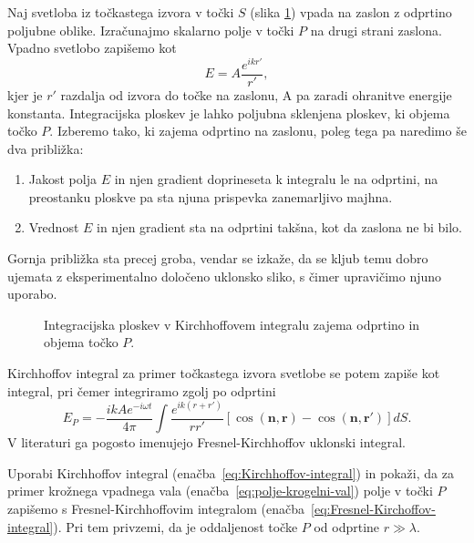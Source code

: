 Naj svetloba iz točkastega izvora v točki $S$ (slika \ref{fig:UklonFK}) vpada na zaslon
z odprtino poljubne oblike. Izračunajmo skalarno polje v točki $P$ na drugi 
strani zaslona. Vpadno svetlobo zapišemo kot
\begin{equation}
\label{eq:polje-krogelni-val}
E = A \frac{e^{ikr'}}{r'},
\end{equation}
kjer je $r'$ razdalja od izvora do točke na zaslonu, A pa zaradi ohranitve energije konstanta.
Integracijska ploskev je lahko poljubna sklenjena ploskev, ki objema točko $P$. Izberemo tako, ki
zajema odprtino na zaslonu, poleg tega pa naredimo še dva približka:\\
\begin{enumerate}
\item Jakost polja $E$ in njen gradient doprineseta k integralu le na odprtini, na preostanku ploskve
pa sta njuna prispevka zanemarljivo majhna.\\
\item Vrednost $E$ in njen gradient sta na odprtini takšna, kot da zaslona ne bi bilo.\\
\end{enumerate}
Gornja približka sta precej groba, vendar se izkaže, da se kljub temu
dobro ujemata z eksperimentalno določeno uklonsko sliko, s čimer 
upravičimo njuno uporabo.

\begin{figure}[]
\centering {} 
  
\caption{Integracijska ploskev v Kirchhoffovem integralu zajema odprtino in objema točko $P$.}
\label{fig:UklonFK}
\end{figure}

Kirchhoffov integral za primer točkastega izvora svetlobe se potem zapiše kot integral, pri čemer
integriramo zgolj po odprtini
\begin{equation}
E_P = -\frac{ik A e^{-i\omega t}}{4\pi}\int\frac{e^{ik(r+r')}}{rr'}\left[\cos(\mathbf{n},
\mathbf{r})-\cos(\mathbf{n},\mathbf{r'})\right] dS.
\label{eq:Fresnel-Kirchoffov-integral}
\end{equation}
V literaturi ga pogosto imenujejo Fresnel-Kirchhoffov uklonski integral.
\begin{definition}
\label{naloga-Fresnel-Kirchhoff-uklon}
Uporabi Kirchhoffov integral (enačba~\ref{eq:Kirchhoffov-integral}) in pokaži, da za primer krožnega vpadnega vala
(enačba~\ref{eq:polje-krogelni-val}) polje v točki $P$ zapišemo s Fresnel-Kirchhoffovim integralom 
(enačba~\ref{eq:Fresnel-Kirchoffov-integral}). Pri tem privzemi, da je oddaljenost točke $P$ od odprtine
$r \gg \lambda$.
\end{definition}

